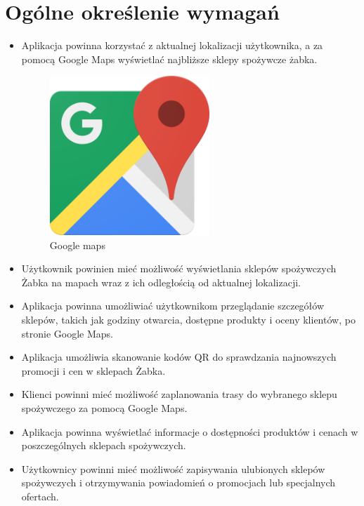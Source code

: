 	\newpage
\section{Ogólne określenie wymagań}		%
\begin{itemize}
	\item Aplikacja powinna korzystać z aktualnej lokalizacji użytkownika, a za pomocą Google Maps wyświetlać najbliższe sklepy spożywcze żabka.
	\begin{figure}[!hbt]
		\begin{center}
			\includegraphics[width=6cm]{rys/Google-maps.png}
			\caption{Google maps}
			\label{rys:gps-icon}
		\end{center}
	\end{figure}
	\item Użytkownik powinien mieć możliwość wyświetlania sklepów spożywczych Żabka na mapach wraz z ich odległością od aktualnej lokalizacji.
	\item Aplikacja powinna umożliwiać użytkownikom przeglądanie szczegółów sklepów, takich jak godziny otwarcia, dostępne produkty i oceny klientów, po stronie Google Maps.
	\item Aplikacja umożliwia skanowanie kodów QR do sprawdzania najnowszych promocji i cen w sklepach Żabka.
	\item Klienci powinni mieć możliwość zaplanowania trasy do wybranego sklepu spożywczego za pomocą Google Maps.
	\item Aplikacja powinna wyświetlać informacje o dostępności produktów i cenach w poszczególnych sklepach spożywczych.
	\item Użytkownicy powinni mieć możliwość zapisywania ulubionych sklepów spożywczych i otrzymywania powiadomień o promocjach lub specjalnych ofertach.	
\end{itemize}
